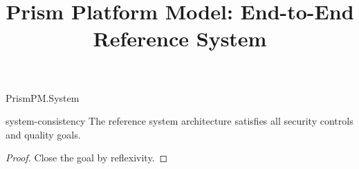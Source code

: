 \begin{lexlean}{PrismPM.System}
\title{Prism Platform Model: End-to-End Reference System}

\begin{theorem}{system-consistency}
\noaxioms
The reference system architecture satisfies all security controls and quality goals.
\begin{proof}
Close the goal by reflexivity.
\end{proof}
\end{theorem}

\end{lexlean}

